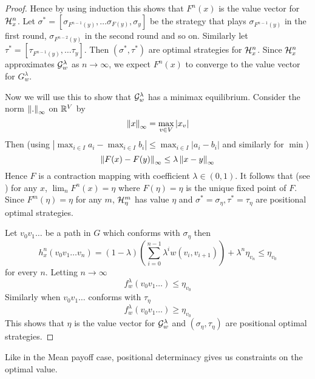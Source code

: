 \begin{proof}
Hence by using induction this shows that $F^n(x)$ is the value vector for $\mathcal{H}^n_x$. Let $\sigma^*=[\sigma_{F^{n-1}(y)},\ldots \sigma_{F(y)},\sigma_y]$ be the strategy that plays $\sigma_{F^{n-1}(y)}$ in the first round, $\sigma_{F^{n-2}(y)}$ in the second round and so on. Similarly let $\tau^*=[\tau_{F^{n-1}(y)},\ldots \tau_y]$. Then $(\sigma^*,\tau^*)$ are optimal strategies for $\mathcal{H}^n_x$. Since $\mathcal{H}^n_x$ approximates $\mathcal{G}^\lambda_w$ as $n \to \infty$, we expect $F^n(x)$ to converge to the value vector for $G^\lambda_w$.

Now we will use this to show that $\mathcal{G}^\lambda_w$ has a minimax equilibrium. Consider the norm $\left\lVert.\right\rVert_\infty$ on $\mathbb{R}^V$ by
\[
    \left\lVert x\right\rVert_\infty = \max_{v \in V} |x_v|
\]
Then (using $|\max_{i\in I} a_i - \max_{i \in I} b_i| \leq \max_{i \in I} |a_i-b_i|$ and similarly for $\min$)
\[
    \left\lVert F(x)-F(y)\right\rVert_\infty \leq \lambda \left\lVert x-y\right\rVert_\infty
\]
Hence $F$ is a contraction mapping with coefficient $\lambda \in (0,1)$. It follows that (see \cite{baby_rudin}) for any $x$, $\lim_n F^n(x) = \eta$ where $F(\eta)=\eta$ is the unique fixed point of $F$. Since $F^m(\eta)=\eta$ for any $m$, $\mathcal{H}^m_\eta$ has value $\eta$ and $\sigma^*=\sigma_\eta, \tau^*=\tau_\eta$ are positional optimal strategies.

Let $v_0v_1 \ldots$ be a path in $G$ which conforms with $\sigma_\eta$ then
\[
    h^n_x(v_0 v_1 \ldots v_n) = (1-\lambda) \left( \sum_{i=0}^{n-1} \lambda^i w(v_i,v_{i+1}) \right) + \lambda^n \eta_{v_n} \leq \eta_{v_0}
\]
for every $n$. Letting $n \to \infty$
\[
    f^\lambda_w(v_0 v_1 \ldots) \leq \eta_{v_0}
\]
Similarly when $v_0 v_1 \ldots$ conforms with $\tau_\eta$
\[
    f^\lambda_w(v_0 v_1 \ldots) \geq \eta_{v_0}
\]
This shows that $\eta$ is the value vector for $\mathcal{G}^\lambda_w$ and $(\sigma_\eta,\tau_\eta)$ are positional optimal strategies.
\end{proof}

Like in the Mean payoff case, positional determinacy gives us constraints on the optimal value.

